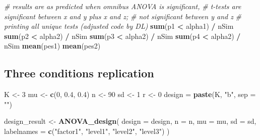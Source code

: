 \documentclass[
]{book}
\newenvironment{Shaded}{\begin{snugshade}}{\end{snugshade}}
\newcommand{\CommentTok}[1]{\textcolor[rgb]{0.56,0.35,0.01}{\textit{#1}}}
\newcommand{\DataTypeTok}[1]{\textcolor[rgb]{0.13,0.29,0.53}{#1}}
\newcommand{\DecValTok}[1]{\textcolor[rgb]{0.00,0.00,0.81}{#1}}
\newcommand{\FloatTok}[1]{\textcolor[rgb]{0.00,0.00,0.81}{#1}}
\newcommand{\KeywordTok}[1]{\textcolor[rgb]{0.13,0.29,0.53}{\textbf{#1}}}
\newcommand{\NormalTok}[1]{#1}
\newcommand{\OperatorTok}[1]{\textcolor[rgb]{0.81,0.36,0.00}{\textbf{#1}}}
\newcommand{\StringTok}[1]{\textcolor[rgb]{0.31,0.60,0.02}{#1}}
\begin{document}
\begin{Shaded}
\begin{Highlighting}[]
\CommentTok{# results are as predicted when omnibus ANOVA is significant,}
\CommentTok{# t-tests are significant between x and y plus x and z; }
\CommentTok{# not significant between y and z}
\CommentTok{# printing all unique tests (adjusted code by DL)}
\KeywordTok{sum}\NormalTok{(p1 }\OperatorTok{<}\StringTok{ }\NormalTok{alpha1) }\OperatorTok{/}\StringTok{ }\NormalTok{nSim}
\KeywordTok{sum}\NormalTok{(p2 }\OperatorTok{<}\StringTok{ }\NormalTok{alpha2) }\OperatorTok{/}\StringTok{ }\NormalTok{nSim}
\KeywordTok{sum}\NormalTok{(p3 }\OperatorTok{<}\StringTok{ }\NormalTok{alpha2) }\OperatorTok{/}\StringTok{ }\NormalTok{nSim}
\KeywordTok{sum}\NormalTok{(p4 }\OperatorTok{<}\StringTok{ }\NormalTok{alpha2) }\OperatorTok{/}\StringTok{ }\NormalTok{nSim}
\KeywordTok{mean}\NormalTok{(pes1)}
\KeywordTok{mean}\NormalTok{(pes2)}
\end{Highlighting}
\end{Shaded}

\hypertarget{three-conditions-replication}{%
\subsection{Three conditions replication}\label{three-conditions-replication}}

\begin{Shaded}
\begin{Highlighting}[]
\NormalTok{K <-}\StringTok{ }\DecValTok{3}
\NormalTok{mu <-}\StringTok{ }\KeywordTok{c}\NormalTok{(}\DecValTok{0}\NormalTok{, }\FloatTok{0.4}\NormalTok{, }\FloatTok{0.4}\NormalTok{)}
\NormalTok{n <-}\StringTok{ }\DecValTok{90}
\NormalTok{sd <-}\StringTok{ }\DecValTok{1}
\NormalTok{r <-}\StringTok{ }\DecValTok{0}
\NormalTok{design =}\StringTok{ }\KeywordTok{paste}\NormalTok{(K, }\StringTok{"b"}\NormalTok{, }\DataTypeTok{sep =} \StringTok{""}\NormalTok{)}
\end{Highlighting}
\end{Shaded}

\begin{Shaded}
\begin{Highlighting}[]
\NormalTok{design_result <-}\StringTok{ }\KeywordTok{ANOVA_design}\NormalTok{(}
  \DataTypeTok{design =}\NormalTok{ design,}
  \DataTypeTok{n =}\NormalTok{ n,}
  \DataTypeTok{mu =}\NormalTok{ mu,}
  \DataTypeTok{sd =}\NormalTok{ sd,}
  \DataTypeTok{labelnames =} \KeywordTok{c}\NormalTok{(}\StringTok{"factor1"}\NormalTok{, }\StringTok{"level1"}\NormalTok{, }\StringTok{"level2"}\NormalTok{, }\StringTok{"level3"}\NormalTok{)}
\NormalTok{  )}
\end{Highlighting}
\end{Shaded}
\end{document}
